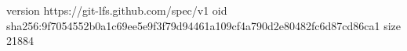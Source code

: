 version https://git-lfs.github.com/spec/v1
oid sha256:9f7054552b0a1c69ee5e9f3f79d94461a109cf4a790d2e80482fc6d87cd86ca1
size 21884
